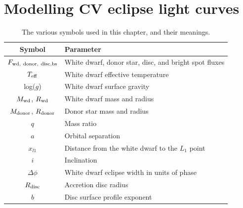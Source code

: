 \newpage
\section{Modelling CV eclipse light curves}
\label{sect:modelling:light curve modelling}

\begin{table}
    \centering
    \caption{The various symbols used in this chapter, and their meanings.}
    \label{table:modelling:parameter key}
    \begin{tabular}{cl}
        \hline
        Symbol & Parameter \\
        \hline
        \hline
        $F_{\rm wd,\ donor,\ disc, bs}$                                 & White dwarf, donor star, disc, and bright spot fluxes   \\
        $T_{\rm eff}$                                                   & White dwarf effective temperature \\
        log($g$)                                                        & White dwarf surface gravity \\
        $M_{\rm wd}$, $R_{\rm wd}$                                      & White dwarf mass and radius                             \\
        $M_{\rm donor}$, $R_{\rm donor}$                                & Donor star mass and radius                              \\
        $q$                                                             & Mass ratio                                              \\
        $a$                                                             & Orbital separation                                      \\
        $x_{l1}$                                                        & Distance from the white dwarf to the $L_1$ point        \\
        $i$                                                             & Inclination                                             \\
        $\Delta \phi$                                                   & White dwarf eclipse width in units of phase             \\
        $R_{\rm disc}$                                                  & Accretion disc radius                                   \\
        $b$                                                             & Disc surface profile exponent                           \\

\end{tabular}
\end{table}
